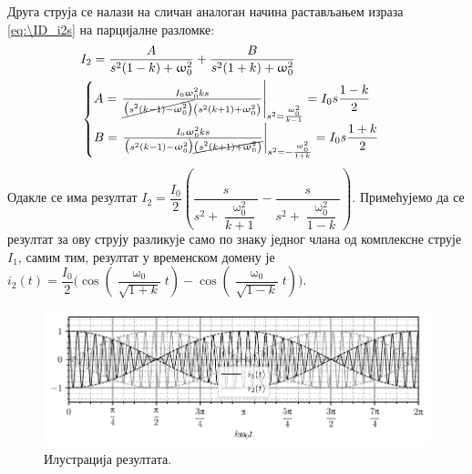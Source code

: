 Друга струја се налази на сличан аналоган начина растављањем израза 
\eqref{eq:\ID_i2s} на парцијалне разломке: 
\begin{eqnarray}
    &I_2 = \dfrac{A}{s^2(1 - k) + \upomega_0^2} + \dfrac{B}{s^2(1+k) + \upomega_0^2} \\ 
    &
    \begin{cases}
    A = 
    \left.
    \frac{I_{0} \upomega_{0}^{2} k s}
    { \cancel{\bigl(s^{2} \left(k - 1\right) - \upomega_{0}^{2} \bigr)} \left(s^{2} \left(k + 1\right) + \upomega_{0}^{2}\right)}
    \right\rvert_{s^2 = \frac{\upomega_0^2}{k-1}}
    = I_0 s \dfrac{1-k}{2} 
        \\    
    B = \left.
        \frac{I_{0} \upomega_{0}^{2} k s}
        { \bigl(s^{2} \left(k - 1\right) - \upomega_{0}^{2} \bigr) \cancel{\left(s^{2} \left(k + 1\right) + \upomega_{0}^{2}\right)}}
    \right\rvert_{s^2 = -\frac{\upomega_0^2}{1 + k}}
    = I_0 s \dfrac{1+k}{2}
    \end{cases}
\end{eqnarray}
   Одакле се има резултат 
    $I_2 = 
\dfrac{I_0}{2} \left(  
    \dfrac{s}{s^2 + \dfrac{\upomega_0^2}{k+1} }
    -
    \dfrac{s}{s^2 + \dfrac{\upomega_0^2}{1-k}}
\right)$. Примећујемо да се резултат за ову струју разликује само по знаку једног члана од 
комплексне струје $I_1$, самим тим, резултат у временском домену је 
$i_2(t) = \dfrac{I_0}{2} 
\Biggl(
    \cos \left( \dfrac{\upomega_0}{\sqrt{1+k}}t\right) - \cos\left(\dfrac{\upomega_0}{\sqrt{1-k}}t\right) 
\Biggr)$. 

\begin{figure}[t!]
    \includegraphics[scale=1]{fig/LC_plot.pdf}
    \caption{Илустрација резултата.}
    \label{fig:\ID.2}
\end{figure}

